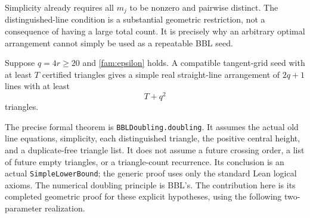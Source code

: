 Simplicity already requires all $m_j$ to be nonzero and pairwise distinct.
The distinguished-line condition is a substantial geometric restriction,
not a consequence of having a large total count.  It is precisely why
an arbitrary optimal arrangement cannot simply be used as a repeatable
BBL seed.

\begin{theorem}
\label{fam:doubling}
Suppose $q=4r\geq20$ and \eqref{fam:epsilon} holds.  A compatible
tangent-grid seed with at least $T$ certified triangles gives a simple
real straight-line arrangement of $2q+1$ lines with at least
\begin{equation}
  T+q^2
  \label{fam:gain}
\end{equation}
triangles.
\end{theorem}

The precise formal theorem is \texttt{BBLDoubling.doubling}.  It assumes
the actual old line equations, simplicity, each distinguished triangle,
the positive central height, and a duplicate-free triangle list.  It
does not assume a future crossing order, a list of future empty
triangles, or a triangle-count recurrence.  Its conclusion is an actual
\texttt{SimpleLowerBound}; the generic proof uses only the standard Lean
logical axioms.  The numerical doubling principle is BBL's.  The
contribution here is its completed geometric proof for these explicit
hypotheses, using the following two-parameter realization.

